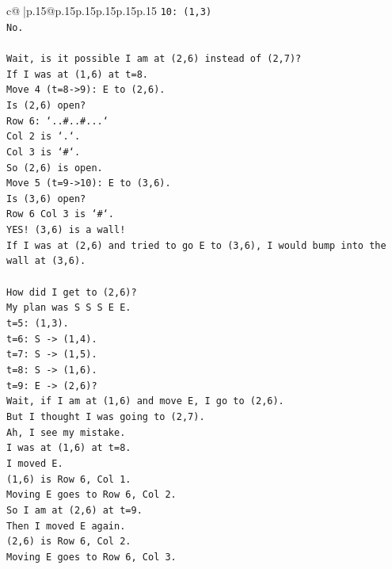 \documentclass{article}
\begin{document}
{\begin{supertabular}{c@{$\;$}|p{.15\linewidth}@{}p{.15\linewidth}p{.15\linewidth}p{.15\linewidth}p{.15\linewidth}p{.15\linewidth}}
{{{\texttt{10: (1,3)} \\
\texttt{No.} \\
\\ 
\texttt{Wait, is it possible I am at (2,6) instead of (2,7)?} \\
\texttt{If I was at (1,6) at t=8.} \\
\texttt{Move 4 (t=8{-}>9): E to (2,6).} \\
\texttt{Is (2,6) open?} \\
\texttt{Row 6: `..\#..\#...`} \\
\texttt{Col 2 is `.`.} \\
\texttt{Col 3 is `\#`.} \\
\texttt{So (2,6) is open.} \\
\texttt{Move 5 (t=9{-}>10): E to (3,6).} \\
\texttt{Is (3,6) open?} \\
\texttt{Row 6 Col 3 is `\#`.} \\
\texttt{YES! (3,6) is a wall!} \\
\texttt{If I was at (2,6) and tried to go E to (3,6), I would bump into the wall at (3,6).} \\
\\ 
\texttt{How did I get to (2,6)?} \\
\texttt{My plan was S S S E E.} \\
\texttt{t=5: (1,3).} \\
\texttt{t=6: S {-}> (1,4).} \\
\texttt{t=7: S {-}> (1,5).} \\
\texttt{t=8: S {-}> (1,6).} \\
\texttt{t=9: E {-}> (2,6)?} \\
\texttt{Wait, if I am at (1,6) and move E, I go to (2,6).} \\
\texttt{But I thought I was going to (2,7).} \\
\texttt{Ah, I see my mistake.} \\
\texttt{I was at (1,6) at t=8.} \\
\texttt{I moved E.} \\
\texttt{(1,6) is Row 6, Col 1.} \\
\texttt{Moving E goes to Row 6, Col 2.} \\
\texttt{So I am at (2,6) at t=9.} \\
\texttt{Then I moved E again.} \\
\texttt{(2,6) is Row 6, Col 2.} \\
\texttt{Moving E goes to Row 6, Col 3.} \\
}}}
\end{supertabular}}
\end{document}
